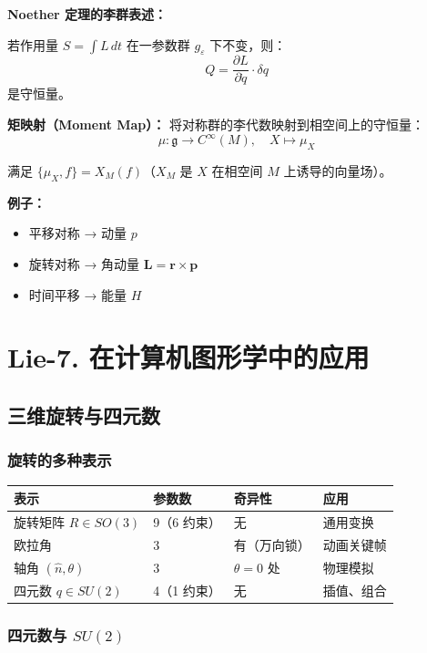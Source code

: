 \textbf{Noether 定理的李群表述：}

若作用量 $S = \int L\,dt$ 在一参数群 $g_\varepsilon$ 下不变，则：
\[
Q = \frac{\partial L}{\partial \dot{q}} \cdot \delta q
\]
是守恒量。

\textbf{矩映射（Moment Map）：} 将对称群的李代数映射到相空间上的守恒量：
\[
\mu: \mathfrak{g} \to C^\infty(M), \quad X \mapsto \mu_X
\]

满足 $\{\mu_X, f\} = X_M(f)$（$X_M$ 是 $X$ 在相空间 $M$ 上诱导的向量场）。

\textbf{例子：}
\begin{itemize}
  \item 平移对称 → 动量 $p$
  \item 旋转对称 → 角动量 $\mathbf{L} = \mathbf{r} \times \mathbf{p}$
  \item 时间平移 → 能量 $H$
\end{itemize}

\section{Lie-7. 在计算机图形学中的应用}

\subsection{三维旋转与四元数}

\subsubsection{旋转的多种表示}

\begin{center}
\begin{tabular}{L{3cm}L{3cm}L{3cm}L{3cm}}
\toprule
\textbf{表示} & \textbf{参数数} & \textbf{奇异性} & \textbf{应用} \\
\midrule
旋转矩阵 $R \in SO(3)$ & 9（6 约束） & 无 & 通用变换 \\
欧拉角 & 3 & 有（万向锁） & 动画关键帧 \\
轴角 $(\hat{n}, \theta)$ & 3 & $\theta = 0$ 处 & 物理模拟 \\
四元数 $q \in SU(2)$ & 4（1 约束） & 无 & 插值、组合 \\
\bottomrule
\end{tabular}
\end{center}

\subsubsection{四元数与 $SU(2)$}

